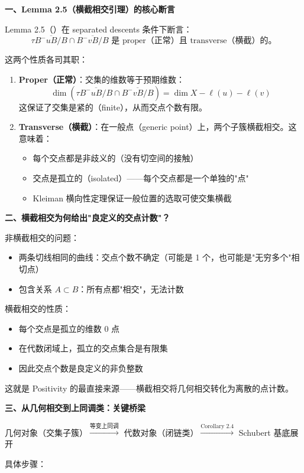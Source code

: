 \textbf{一、Lemma 2.5（横截相交引理）的核心断言}

Lemma 2.5（\cite[ Lemma 2.5]{GX2025}）在 separated descents 条件下断言：
$$\tau \overline{B^-uB/B} \cap \overline{B^-vB/B} \text{ 是 proper（正常）且 transverse（横截）的。}$$

这两个性质各司其职：

\begin{enumerate}
\item \textbf{Proper（正常）}：交集的维数等于预期维数：
$$\dim\left(\tau \overline{B^-uB/B} \cap \overline{B^-vB/B}\right) = \dim X - \ell(u) - \ell(v)$$
这保证了交集是紧的（finite），从而交点个数有限。

\item \textbf{Transverse（横截）}：在一般点（generic point）上，两个子簇横截相交。这意味着：
\begin{itemize}
\item 每个交点都是非歧义的（没有切空间的接触）
\item 交点是孤立的（isolated）——每个交点都是一个单独的"点"
\item Kleiman 横向性定理保证一般位置的选取可使交集横截
\end{itemize}
\end{enumerate}

\textbf{二、横截相交为何给出"良定义的交点计数"？}

非横截相交的问题：
\begin{itemize}
\item 两条切线相同的曲线：交点个数不确定（可能是 1 个，也可能是"无穷多个"相切点）
\item 包含关系 $A \subset B$：所有点都"相交"，无法计数
\end{itemize}

横截相交的性质：
\begin{itemize}
\item 每个交点是孤立的维数 0 点
\item 在代数闭域上，孤立的交点集合是有限集
\item 因此交点个数是良定义的非负整数
\end{itemize}

这就是 Positivity 的最直接来源——横截相交将几何相交转化为离散的点计数。

\textbf{三、从几何相交到上同调类：关键桥梁}

几何对象（交集子簇）$\xrightarrow{\text{等变上同调}}$ 代数对象（闭链类）$\xrightarrow{\text{Corollary 2.4}}$ Schubert 基底展开

具体步骤：

